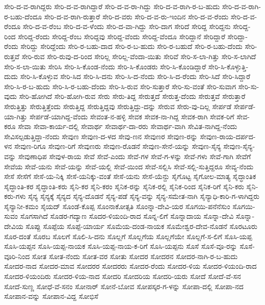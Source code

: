 ಸೇರಿ-ದ-ವ-ರಾಗಿದ್ದರು
ಸೇರಿ-ದ-ವ-ರಾಗಿದ್ದಾರೆ
ಸೇರಿ-ದ-ವ-ರಾ-ಗಿದ್ದು
ಸೇರಿ-ದ-ವ-ರಾಗಿ-ರ-ಬ-ಹುದು
ಸೇರಿ-ದ-ವ-ರಾಗಿ-ರ-ಬಹು-ದೆಂದೂ
ಸೇರಿ-ದ-ವ-ರಾಗಿ-ರುತ್ತಾರೆ
ಸೇರಿ-ದ-ವರು
ಸೇರಿ-ದ-ವ-ರು-ಇಂದಿನ
ಸೇರಿ-ದ-ವ-ರೆಂದು
ಸೇರಿ-ದ-ವ-ರೆಂದೂ
ಸೇರಿ-ದ-ವ-ರೆಂಬ
ಸೇರಿ-ದ-ವ-ಳೆಂದು
ಸೇರಿ-ದ-ವಾ-ಗಿದ್ದು
ಸೇರಿ-ದಾಗ
ಸೇರಿದೆ
ಸೇರಿದ್ದ
ಸೇರಿದ್ದನು
ಸೇರಿದ್ದ-ರಿಂದ
ಸೇರಿದ್ದ-ರೆಂದು
ಸೇರಿದ್ದ-ರೆಂಬ
ಸೇರಿದ್ದವು
ಸೇರಿದ್ದ-ವೆಂದು
ಸೇರಿದ್ದ-ವೆಂದೂ
ಸೇರಿದ್ದಾನೆ
ಸೇರಿದ್ದಾರೆ
ಸೇರಿದ್ದಾ-ರೆಂದು
ಸೇರಿದ್ದು
ಸೇರಿದ್ದೆಂದು
ಸೇರಿ-ರ-ಬಹು-ದಾದ
ಸೇರಿ-ರ-ಬ-ಹುದು
ಸೇರಿ-ರ-ಬಹುದೆ
ಸೇರಿ-ರ-ಬಹು-ದೆಂದು
ಸೇರಿ-ರುತ್ತವೆ
ಸೇರಿ-ರುವ
ಸೇರಿ-ರುವು-ದ-ರಿಂದ
ಸೇರಿಲ್ಲ
ಸೇರಿಲ್ಲ-ವೆಂದಾ-ಯಿತು
ಸೇರಿವೆ
ಸೇರಿ-ಸ-ಲಾ-ಗಿತ್ತು
ಸೇರಿ-ಸ-ಲಾಗಿದೆ
ಸೇರಿ-ಸ-ಲಾ-ಯಿತು
ಸೇರಿಸಿ
ಸೇರಿ-ಸಿ-ಕೊಂಡ-ನೆಂದು
ಸೇರಿ-ಸಿ-ಕೊಂಡರು
ಸೇರಿ-ಸಿ-ಕೊಂಡಿದ್ದಾರೆ
ಸೇರಿ-ಸಿ-ಕೊಳ್ಳುತ್ತಿ-ದುದು
ಸೇರಿ-ಸಿ-ಕೊಳ್ಳುವ
ಸೇರಿ-ಸಿದ
ಸೇರಿ-ಸಿ-ದನು
ಸೇರಿ-ಸಿ-ದ-ನೆಂದು
ಸೇರಿ-ಸಿ-ದ-ರೆಂದು
ಸೇರಿ-ಸಿದೆ
ಸೇರಿ-ಸಿದ್ದಾರೆ
ಸೇರಿ-ಸಿ-ರ-ಬ-ಹುದು
ಸೇರಿ-ಸಿ-ರ-ಬಹು-ದೆಂದು
ಸೇರಿ-ಸಿ-ರುವ
ಸೇರಿ-ಸುತ್ತಾರೆ
ಸೇರಿ-ಸು-ವಂತೆ
ಸೇರಿ-ಸುವಾಗ
ಸೇರಿ-ಸು-ವುದು
ಸೇರಿ-ಹೋಗಿದೆ
ಸೇರಿ-ಹೋಗಿ-ರುವ
ಸೇರು
ಸೇರು-ತಿದ್ದ
ಸೇರುತ್ತದೆ
ಸೇರುತ್ತ-ದೆಂದು
ಸೇರುತ್ತವೆ
ಸೇರುತ್ತಾರೆ
ಸೇರುತ್ತಿತ್ತು
ಸೇರುತ್ತಿತ್ತೆಂದು
ಸೇರುತ್ತಿದ್ದ
ಸೇರುತ್ತಿದ್ದವು
ಸೇರುತ್ತಿದ್ದು-ದನ್ನು
ಸೇರುವ
ಸೇರು-ವು-ದಿಲ್ಲ
ಸೇರ್ಪಡೆ
ಸೇರ್ಪಡೆ-ಯಾ-ಗಿತ್ತು
ಸೇರ್ಪಡೆ-ಯಾಗಿದ್ದ-ವೆಂದು
ಸೇವಂತ-ನ-ಹಳ್ಳಿ
ಸೇವಕ
ಸೇವಕ-ನಾ-ಗಿದ್ದ
ಸೇವಕ-ರಾಗಿ
ಸೇವಕ-ರಿಗೆ
ಸೇವ-ಕರೂ
ಸೇವಾ
ಸೇವಾ-ಕಾರ್ಯ-ದಲ್ಲಿ
ಸೇವಾರ್ಥ
ಸೇವಾರ್ಥ-ದಾ-ರರು
ಸೇವಾರ್ಥ-ವಾಗಿ
ಸೇವಿತ-ನಾಗಿದ್ದ-ನೆಂದು
ಸೇವಿಸಲ್ಪಡುತ್ತಿದ್ದಾ-ನೆಂದು
ಸೇವುಣ
ಸೇವುಣ-ದ-ಳದ
ಸೇವು-ಣನ
ಸೇವುಣರ
ಸೇವುಣ-ರನ್ನು
ಸೇವುಣ-ರಾಯ-ದರ್ಪದ-ಳನ
ಸೇವುಣ-ರಿಗೂ
ಸೇವುಣ-ರಿಗೆ
ಸೇವುಣರು
ಸೇವುಣ-ರೊಡನೆ
ಸೇವುಣ-ಸೇನೆ-ಯನ್ನು
ಸೇವುಣ-ಸೈನ್ಯ
ಸೇವುಣ-ಸೈನ್ಯ-ವನ್ನು
ಸೇವುಣಾಧಿಪ
ಸೇವುಳ-ರಾಯ
ಸೇವೆ
ಸೇವೆ-ಎಂದು
ಸೇವೆ-ಗಳ
ಸೇವೆ-ಗ-ಳನ್ನು
ಸೇವೆ-ಗಳು
ಸೇವೆ-ಗಾಗಿ
ಸೇವೆಗೆ
ಸೇವೆಯ
ಸೇವೆ-ಯನು
ಸೇವೆ-ಯನ್ನು
ಸೇವೆ-ಯಲ್ಲಿ
ಸೇವೆ-ಯಿಂದ
ಸೇವೆ-ಸಲ್ಲಿಸಿ
ಸೇವೆ-ಸಲ್ಲಿ-ಸುತ್ತಿದ್ದರೂ
ಸೇವ್ಯ-ನೆಂದು
ಸೇಸೆ
ಸೇಸೆಗೆ
ಸೇಸೆ-ಯ-ನಿಕ್ಕಿ
ಸೇಸೆ-ಯನಿಕ್ಕು-ವಂತೆ
ಸೇಸೆ-ಯನು
ಸೇಸೆ-ಯೆನ್ದು
ಸೈಗೊಟ್ಟ
ಸೈಗೋಲ-ಮಾತ್ಯ
ಸೈದ್ಧಾಂತಿಕ
ಸೈದ್ಧಾಂತಿ-ಕರ
ಸೈದ್ಧಾಂತಿ-ಕರು
ಸೈನಿ-ಕರ
ಸೈನಿ-ಕರಂ
ಸೈನಿಕ-ರನ್ನು
ಸೈನಿಕ-ರಲ್ಲಿ
ಸೈನಿಕ-ರಿಂದ
ಸೈನಿಕ-ರಿಗೆ
ಸೈನಿ-ಕರು
ಸೈನಿ-ಕರು-ಗಳು
ಸೈನ್ಯ
ಸೈನ್ಯಕ್ಕೆ
ಸೈನ್ಯದ
ಸೈನ್ಯ-ದೊಡನೆ
ಸೈನ್ಯ-ಪಡೆ
ಸೈನ್ಯ-ವನ್ನು
ಸೈನ್ಯ-ಸಮೇತ-ನಾಗಿ
ಸೈನ್ಯಾಧಿ-ಕಾರಿ-ಗ-ಳಾಗಿದ್ದರು
ಸೈನ್ಯಾನೀ-ಕಮಂ
ಸೈಯದ್
ಸೊಂಡೆ-ಕೊಪ್ಪ
ಸೊಂನಾಕೋತ್ಸತಿ
ಸೊಂನ್ನಾ-ದೇವಿ-ಯರ
ಸೊಗಯಿ-ಪನೆನೆಸುಂ
ಸೊಗಯಿ-ಸುವಂ
ಸೊಗಸಾಗಿದೆ
ಸೊಡರ-ಗದ್ಯಾಣ
ಸೊದರ-ಳಿಯಂದಿ-ರಾದ
ಸೊನ್ನ-ಲಿಗೆ
ಸೊನ್ನಾದಾಯ
ಸೊನ್ನಾ-ದೇವಿ
ಸೊನ್ನಾ-ದೇವಿಯ
ಸೊಪ್ಪು
ಸೊಪ್ಪೆಯ
ಸೊಪ್ಪೆ-ಯಾರ್ಯ
ಸೊಮೆಯ-ದಂಡ-ನಾಯಕ
ಸೊಮೇಶ್ವರ-ದೇವ-ನೊಡನೆ
ಸೊರಟೂರು
ಸೊರ-ದಂತೆ
ಸೊರಬ
ಸೊಲಗೆ
ಸೊಲಿ-ಸಿ-ದನು
ಸೊಲ್ಲಗೆ
ಸೊಲ್ಲಗೆಯ
ಸೊಲ್ಲಗೆಯೇ
ಸೊಲ್ಲಗೆ-ಸ-ಲಿಗೆ
ಸೊಸಿ-ಯಪ್ಪ
ಸೊಸಿ-ಯಪ್ಪನ
ಸೊಸಿ-ಯಪ್ಪ-ನಾಯಕ
ಸೊಸಿ-ಯಪ್ಪ-ನಾಯ-ಕ-ರಿಗೆ
ಸೊಸಿ-ಯಪ್ಪನು
ಸೊಸೆ
ಸೊಸೆ-ವೂ-ರನ್ನು
ಸೊಸೆ-ವೂರಿ-ನಿಂದ
ಸೋತ
ಸೋತ-ನೆಂದು
ಸೋತ-ವರ
ಸೋತು
ಸೋದರ
ಸೋದರನ
ಸೋದರ-ನಾಗಿ-ರ-ಬ-ಹುದು
ಸೋದರ-ನಾದ
ಸೋದರ-ಮಾವ
ಸೋದರರ
ಸೋದರರು
ಸೋದರ-ರೆಂದು
ಸೋದರ-ಳಿಯ
ಸೋದರ-ಳಿಯಂದಿ-ರಾದ
ಸೋದರ-ಳಿಯಂದಿರು
ಸೋದರ-ಳಿಯ-ನಾದ
ಸೋದರಿ
ಸೋದರಿಯ
ಸೋದರಿ-ಯರು
ಸೋದೆ
ಸೋದೆ-ವೆ-ಸನ
ಸೋದೆ-ಸುಣ್ಣ
ಸೋಧೆ-ವೆ-ಸನಂ
ಸೋನಾರ್
ಸೋನೆ-ಬೋವ
ಸೋಪಸ್ಕರ-ಗ-ಳನ್ನು
ಸೋಪಾ-ದಲ್ಲಿ
ಸೋಪಾ-ನದ
ಸೋಪಾನ-ವನ್ನು
ಸೋಪಾನ-ವಿದ್ದ
ಸೋಭಿಸೆ

